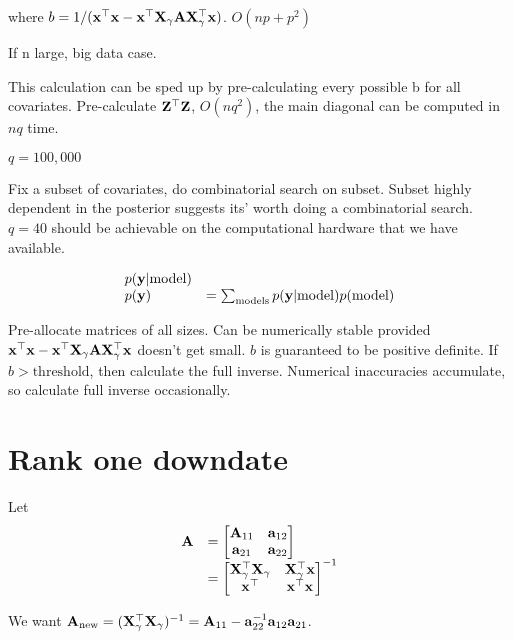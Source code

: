 \documentclass{amsart}
\begin{document}
where $b = 1/({\bf x}^\top {\bf x} - {\bf x}^\top {\bf X}_\gamma {\bf A} {\bf X}_\gamma^\top {\bf x})$. $O(np + p^2)$

If n large, big data case.

This calculation can be sped up by pre-calculating every possible b for all covariates.
Pre-calculate ${\bf Z}^\top {\bf Z}$, $O(nq^2)$, the main diagonal can be computed in $nq$ time.

$q = 100,000$

Fix a subset of covariates, do combinatorial search on subset.
Subset highly dependent in the posterior suggests its' worth doing a combinatorial search.
$q = 40$ should be achievable on the computational hardware that we have available.

\begin{equation*}
\begin{array}{ll}
p({\bf y} | \text{model}) & \\
p({\bf y}) &= \sum_{\text{models}} p({\bf y} | \text{model}) p(\text{model})
\end{array}
\end{equation*}

Pre-allocate matrices of all sizes.
Can be numerically stable provided ${\bf x}^\top {\bf x} - {\bf x}^\top {\bf X}_\gamma {\bf A} {\bf X}_\gamma^\top {\bf x}$ doesn't get small.
$b$ is guaranteed to be positive definite.
If $b > \text{threshold}$, then calculate the full inverse.
Numerical inaccuracies accumulate, so calculate full inverse occasionally.

\section{Rank one downdate}

Let
\begin{equation*}
\begin{array}{ll}
{\bf A} &= \begin{bmatrix}
{\bf A}_{11} & {\bf a}_{12} \\
{\bf a}_{21} & {\bf a}_{22}
\end{bmatrix} \\
&= \begin{bmatrix}
{\bf X}_\gamma^\top {\bf X}_\gamma & {\bf X}_\gamma^\top {\bf x} \\
{\bf x}^\top & {\bf x}^\top {\bf x}
\end{bmatrix}^{-1}
\end{array}
\end{equation*}

We want ${\bf A}_{\text{new}} = ({\bf X}_\gamma^\top {\bf X}_\gamma)^{-1} = {\bf A}_{11} - {\bf a}_{22}^{-1} {\bf a}_{12} {\bf a}_{21}$.
\end{document}
